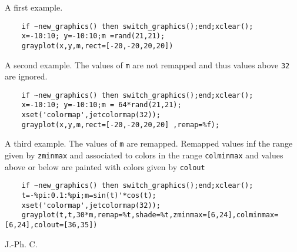 \begin{examples}

\noindent A first example.
  \begin{Verbatim}
    if ~new_graphics() then switch_graphics();end;xclear();
    x=-10:10; y=-10:10;m =rand(21,21);
    grayplot(x,y,m,rect=[-20,-20,20,20])
  \end{Verbatim}

\noindent A second example. The values of \verb!m! are not remapped and 
thus values above \verb!32! are ignored. 

  \begin{Verbatim}
    if ~new_graphics() then switch_graphics();end;xclear();
    x=-10:10; y=-10:10;m = 64*rand(21,21);
    xset('colormap',jetcolormap(32));
    grayplot(x,y,m,rect=[-20,-20,20,20] ,remap=%f);
  \end{Verbatim}

\noindent A third example. The values of \verb!m! are remapped. 
Remapped values inf the range given by \verb!zminmax! and associated to colors in the range 
\verb!colminmax! and values above or below are painted with colors given by \verb!colout!

  \begin{Verbatim}
    if ~new_graphics() then switch_graphics();end;xclear();
    t=-%pi:0.1:%pi;m=sin(t)'*cos(t);
    xset('colormap',jetcolormap(32));
    grayplot(t,t,30*m,remap=%t,shade=%t,zminmax=[6,24],colminmax=[6,24],colout=[36,35])
  \end{Verbatim}
\end{examples}

\begin{manseealso}
     
\end{manseealso}


\begin{authors}
  J.-Ph. C.
\end{authors}
